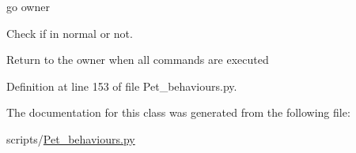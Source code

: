 go owner 

Check if in normal or not.

Return to the owner when all commands are executed 

Definition at line 153 of file Pet\+\_\+behaviours.\+py.



The documentation for this class was generated from the following file\+:\begin{DoxyCompactItemize}
\item 
scripts/\hyperlink{Pet__behaviours_8py}{Pet\+\_\+behaviours.\+py}\end{DoxyCompactItemize}
